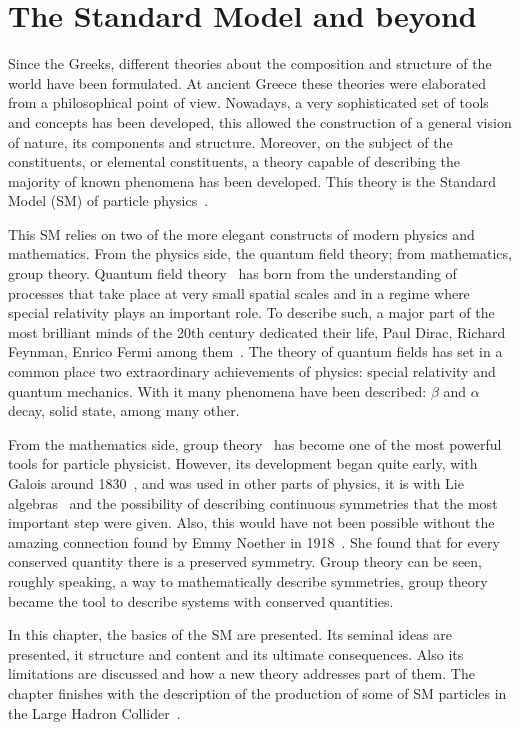 \chapter[The Standard Model]{The Standard Model and beyond}
\label{chap:SM}
Since the Greeks, different theories about the composition and structure of the world have been formulated. At ancient Greece these theories were elaborated from a philosophical point of view. Nowadays, a very sophisticated set of tools and concepts has been developed, this allowed the construction of a general vision of nature, its components and structure. Moreover, on the subject of the constituents, or elemental constituents, a theory capable of describing the majority of known phenomena has been developed. This theory is the Standard Model (SM) of particle physics~\cite{Griffiths:2008zz}. 

This SM relies on two of the more elegant constructs of modern physics and mathematics. From the physics side, the quantum field theory; from mathematics, group theory. Quantum field theory~\cite{Maggiore:2005qv,Lahiri:2005sm} has born from the understanding of processes that take place at very small spatial scales and in a regime where special relativity plays an important role. To describe such, a major part of the most brilliant minds of the 20th century dedicated their life, Paul Dirac, Richard Feynman, Enrico Fermi among them~\cite{Griffiths:2008zz}. The theory of quantum fields has set in a common place two extraordinary achievements of physics: special relativity and quantum mechanics. With it many phenomena have been described: $\beta$ and $\alpha$ decay, solid state, among many other.

From the mathematics side, group theory~\cite{Georgi:1999wka} has become one of the most powerful tools for particle physicist. However, its development began quite early, with Galois around 1830~\cite{Kleiner:2007}, and was used in other parts of physics, it is with Lie algebras~\cite{Georgi:1999wka} and the possibility of describing continuous symmetries that the most important step were given. Also, this would have not been possible without the amazing connection found by Emmy Noether in 1918~\cite{1971TTSP....1..186N}. She found that for every conserved quantity there is a preserved symmetry. Group theory can be seen, roughly speaking, a way to mathematically describe symmetries, group theory became the tool to describe systems with conserved quantities. 

In this chapter, the basics of the SM are presented. Its seminal ideas are presented, it structure and content and its ultimate consequences. Also its limitations are discussed and how a new theory addresses part of them. The chapter finishes with the description of the production of some of SM particles in the Large Hadron Collider~\cite{1748-0221-3-08-S08001}. 

